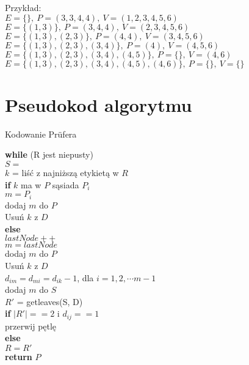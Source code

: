 \documentclass[a4paper,12p]{article}
\newcommand\tab[1][1cm]{\hspace*{#1}}
\begin{document}
Przykład: \\
$E=\{\},~P=(3,3,4,4),~V=(1,2,3,4,5,6)$ \\
$E=\{(1,3)\},~P=(3,4,4),~V=(2,3,4,5,6)$ \\
$E=\{(1,3), (2,3)\},~P=(4,4),~V=(3,4,5,6)$ \\
$E=\{(1,3), (2,3), (3,4)\},~P=(4),~V=(4,5,6)$ \\
$E=\{(1,3), (2,3), (3,4), (4,5)\},~P=\{\},~V=(4,6)$ \\
$E=\{(1,3), (2,3), (3,4), (4,5), (4,6)\},~P=\{\},~V=\{\}$ \\


\section{Pseudokod algorytmu}

\begin{algorithm}
		\caption{Kodowanie Prüfera}
		\label{algo}
		\textbf{while} (R jest niepusty) \\
		\tab $S = {}$ \\
		\tab $k$ = liść z najniższą etykietą w $R$ \\
		\tab \textbf{if} $k$ ma w $P$ sąsiada $P_i$ \\
		\tab \tab $m = P_i$ \\
		\tab \tab dodaj $m$ do $P$ \\
		\tab \tab Usuń $k$ z $D$ \\
		\tab \textbf{else} \\
		\tab \tab $lastNode++$ \\
		\tab \tab $m = lastNode$ \\
		\tab \tab dodaj $m$ do $P$ \\
		\tab \tab Usuń $k$ z $D$ \\
		\tab \tab $d_{im} = d_{mi} = d_{ik} - 1$, dla $i = 1, 2, \cdots m-1$ \\
		\tab \tab dodaj $m$ do $S$ \\
		\tab $R'$ = getleaves(S, D) \\
		\tab \textbf{if} $|R'| == 2$ i $d_{ij} == 1$ \\
		\tab \tab przerwij pętlę \\
		\tab \textbf{else} \\
		\tab \tab $R = R'$ \\
		\textbf{return} $P$ \\
\end{algorithm}
\end{document}
